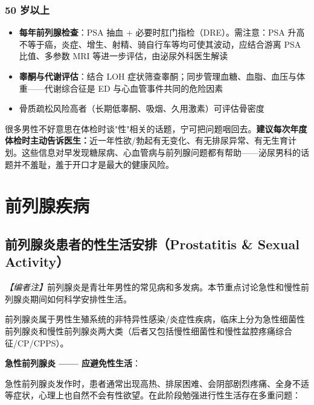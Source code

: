 \subsubsection{50 岁以上}

\begin{itemize}
	\item \textbf{每年前列腺检查}：PSA 抽血 + 必要时肛门指检（DRE）。需注意：PSA 升高不等于癌，炎症、增生、射精、骑自行车等均可使其波动，应结合游离 PSA 比值、多参数 MRI 等进一步评估，由泌尿外科医生解读
	\item \textbf{睾酮与代谢评估}：结合 LOH 症状筛查睾酮；同步管理血糖、血脂、血压与体重——代谢综合征是 ED 与心血管事件共同的危险因素
	\item 骨质疏松风险高者（长期低睾酮、吸烟、久用激素）可评估骨密度
\end{itemize}

\begin{tcolorbox}[colback=pink!5!white,colframe=red!50!black,title=贴心小叮咛]
很多男性不好意思在体检时谈"性"相关的话题，宁可把问题咽回去。\textbf{建议每次年度体检时主动告诉医生：}近一年性欲/勃起有无变化、有无排尿异常、有无生育计划。这些信息对早发现糖尿病、心血管病与前列腺问题都有帮助——泌尿男科的话题并不羞耻，羞于开口才是最大的健康风险。
\end{tcolorbox}

\section{前列腺疾病}

\subsection{前列腺炎患者的性生活安排（Prostatitis \& Sexual Activity）}

\noindent\textit{【编者注】}前列腺炎是青壮年男性的常见病和多发病。本节重点讨论急性和慢性前列腺炎期间如何科学安排性生活。

\vspace{0.5em}
前列腺炎属于男性生殖系统的非特异性感染/炎症性疾病，临床上分为急性细菌性前列腺炎和慢性前列腺炎两大类（后者又包括慢性细菌性和慢性盆腔疼痛综合征/CP/CPPS）。

\vspace{0.5em}
\noindent\textbf{急性前列腺炎 —— 应避免性生活}：

急性前列腺炎发作时，患者通常出现高热、排尿困难、会阴部剧烈疼痛、全身不适等症状，心理上也自然不会有性欲望。在此阶段勉强进行性生活存在多重问题：

